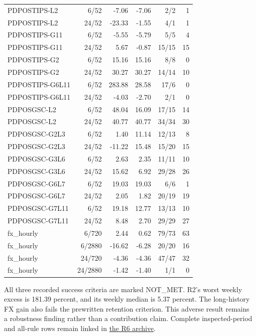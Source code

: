 \begin{longtable}{p{35mm}rrrrr}
PDPOSTIPS-L2 & 6/52 & -7.06 & -7.06 & 2/2 & 1 \\
PDPOSTIPS-L2 & 24/52 & -23.33 & -1.55 & 4/1 & 1 \\
PDPOSTIPS-G11 & 6/52 & -5.55 & -5.79 & 5/5 & 4 \\
PDPOSTIPS-G11 & 24/52 & 5.67 & -0.87 & 15/15 & 15 \\
PDPOSTIPS-G2 & 6/52 & 15.16 & 15.16 & 8/8 & 0 \\
PDPOSTIPS-G2 & 24/52 & 30.27 & 30.27 & 14/14 & 10 \\
PDPOSTIPS-G6L11 & 6/52 & 283.88 & 28.58 & 17/6 & 0 \\
PDPOSTIPS-G6L11 & 24/52 & -4.03 & -2.70 & 2/1 & 0 \\
PDPOSGSC-L2 & 6/52 & 48.04 & 16.09 & 17/15 & 14 \\
PDPOSGSC-L2 & 24/52 & 40.77 & 40.77 & 34/34 & 30 \\
PDPOSGSC-G2L3 & 6/52 & 1.40 & 11.14 & 12/13 & 8 \\
PDPOSGSC-G2L3 & 24/52 & -11.22 & 15.48 & 15/20 & 15 \\
PDPOSGSC-G3L6 & 6/52 & 2.63 & 2.35 & 11/11 & 10 \\
PDPOSGSC-G3L6 & 24/52 & 15.62 & 6.92 & 29/28 & 26 \\
PDPOSGSC-G6L7 & 6/52 & 19.03 & 19.03 & 6/6 & 1 \\
PDPOSGSC-G6L7 & 24/52 & 2.05 & 1.82 & 20/19 & 19 \\
PDPOSGSC-G7L11 & 6/52 & 19.18 & 12.77 & 13/13 & 10 \\
PDPOSGSC-G7L11 & 24/52 & 8.48 & 2.70 & 29/29 & 27 \\
fx\_hourly & 6/720 & 2.44 & 0.62 & 79/73 & 63 \\
fx\_hourly & 6/2880 & -16.62 & -6.28 & 20/20 & 16 \\
fx\_hourly & 24/720 & -4.36 & -4.36 & 47/47 & 32 \\
fx\_hourly & 24/2880 & -1.42 & -1.40 & 1/1 & 0 \\
\end{longtable}
\endgroup

All three recorded success criteria are marked NOT\_MET.
R2's worst weekly excess is 181.39 percent,
and its weekly median is 5.37 percent.
The long-history FX gain also fails the prewritten retention criterion.
This adverse result remains a robustness finding rather than a contribution
claim. Complete inspected-period and all-rule rows remain linked in
\href{https://github.com/ByronLi0207/financial-mathematics-paper-20261020/blob/revision-v7-final/results/supervisor-20261023/r6/README.md}{the R6 archive}.